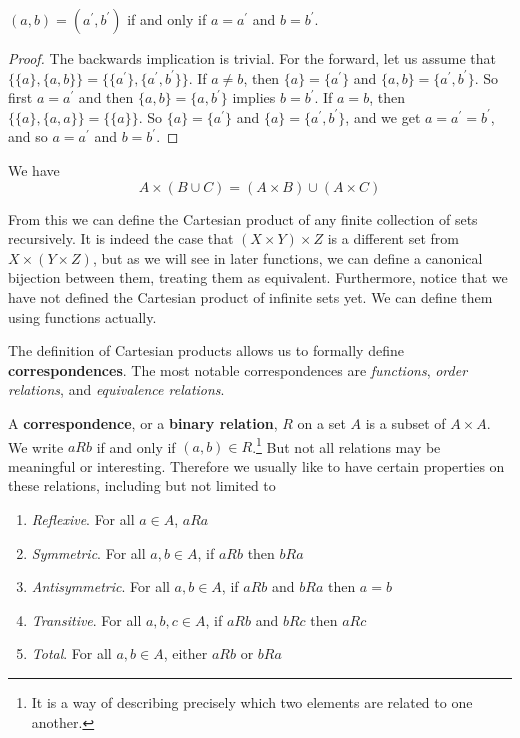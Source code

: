   \begin{theorem}
    $(a, b) = (a^\prime, b^\prime)$ if and only if $a = a^\prime$ and $b = b^\prime$. 
  \end{theorem}
  \begin{proof}
    The backwards implication is trivial. For the forward, let us assume that $\{\{a\}, \{a, b\}\} = \{\{a^\prime\}, \{a^\prime, b^\prime\}\}$. If $a \neq b$, then $\{a\} = \{a^\prime\}$ and $\{a, b\} = \{a^\prime, b^\prime\}$. So first $a = a^\prime$ and then $\{a, b\} = \{a, b^\prime\}$ implies $b = b^\prime$. If $a = b$, then $\{\{a\}, \{a, a\}\} = \{\{a\}\}$. So $\{a\} = \{a^\prime\}$ and $\{a\} = \{a^\prime, b^\prime\}$, and we get $a = a^\prime = b^\prime$, and so $a = a^\prime$ and $b = b^\prime$. 
  \end{proof}

  \begin{theorem}
    We have 
    \begin{equation}
      A \times (B \cup C) = (A \times B) \cup (A \times C)
    \end{equation}
  \end{theorem}

  From this we can define the Cartesian product of any finite collection of sets recursively. It is indeed the case that $(X \times Y) \times Z$ is a different set from $X \times (Y \times Z)$, but as we will see in later functions, we can define a canonical bijection between them, treating them as equivalent. Furthermore, notice that we have not defined the Cartesian product of infinite sets yet. We can define them using functions actually. 

  The definition of Cartesian products allows us to formally define \textbf{correspondences}. The most notable correspondences are \textit{functions}, \textit{order relations}, and \textit{equivalence relations}. 

  \begin{definition}
    A \textbf{correspondence}, or a \textbf{binary relation}, $R$ on a set $A$ is a subset of $A \times A$. We write $aRb$ if and only if $(a,b) \in R$.\footnote{It is a way of describing precisely which two elements are related to one another.} But not all relations may be meaningful or interesting. Therefore we usually like to have certain properties on these relations, including but not limited to 
    \begin{enumerate}
      \item \textit{Reflexive}. For all $a \in A$, $aRa$
      \item \textit{Symmetric}. For all $a,b \in A$, if $aRb$ then $bRa$
      \item \textit{Antisymmetric}. For all $a,b \in A$, if $aRb$ and $bRa$ then $a=b$
      \item \textit{Transitive}. For all $a,b,c \in A$, if $aRb$ and $bRc$ then $aRc$
      \item \textit{Total}. For all $a,b \in A$, either $aRb$ or $bRa$
    \end{enumerate}
  \end{definition} 

